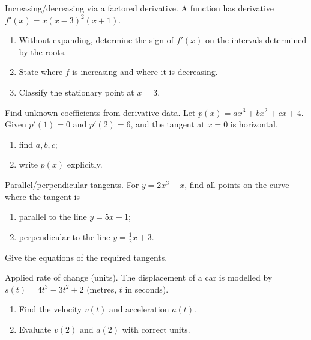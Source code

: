 \documentclass[11pt]{article}
\def\textbf#1{#1}%
\newcounter{question}
\begin{document}
\begin{question}
\textbf{Increasing/decreasing via a factored derivative.}
A function has derivative $f'(x)=x(x-3)^{2}(x+1)$.
\begin{enumerate}
  \item Without expanding, determine the sign of $f'(x)$ on the intervals determined by the roots.
  \item State where $f$ is increasing and where it is decreasing.
  \item Classify the stationary point at $x=3$.
\end{enumerate}
\end{question}

\begin{question}
\textbf{Find unknown coefficients from derivative data.}
Let $p(x)=ax^{3}+bx^{2}+cx+4$. Given $p'(1)=0$ and $p'(2)=6$, and the tangent at $x=0$ is horizontal,
\begin{enumerate}
  \item find $a,b,c$;
  \item write $p(x)$ explicitly.
\end{enumerate}
\end{question}

\begin{question}
\textbf{Parallel/perpendicular tangents.}
For $y=2x^{3}-x$, find all points on the curve where the tangent is
\begin{enumerate}
  \item parallel to the line $y=5x-1$;
  \item perpendicular to the line $y=\tfrac12 x+3$.
\end{enumerate}
Give the equations of the required tangents.
\end{question}

\begin{question}
\textbf{Applied rate of change (units).}
The displacement of a car is modelled by $s(t)=4t^{3}-3t^{2}+2$ (metres, $t$ in seconds).
\begin{enumerate}
  \item Find the velocity $v(t)$ and acceleration $a(t)$.
  \item Evaluate $v(2)$ and $a(2)$ with correct units.
\end{enumerate}
\end{question}
\end{document}
